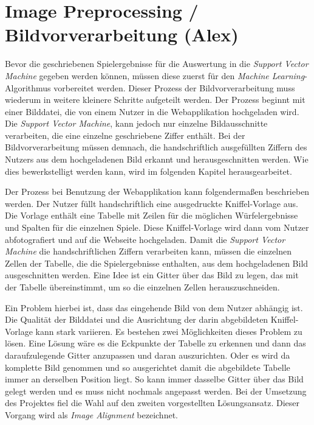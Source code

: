 \section{Image Preprocessing / Bildvorverarbeitung (Alex)}
Bevor die geschriebenen Spielergebnisse für die Auswertung in die \textit{Support Vector Machine} gegeben werden können, müssen diese zuerst
für den \textit{Machine Learning}-Algorithmus vorbereitet werden. Dieser Prozess der Bildvorverarbeitung muss wiederum in weitere kleinere
Schritte aufgeteilt werden. Der Prozess beginnt mit einer Bilddatei, die von einem Nutzer in die Webapplikation hochgeladen wird. 
Die \textit{Support Vector Machine}, kann jedoch nur einzelne Bildausschnitte verarbeiten, die eine einzelne geschriebene Ziffer enthält.
Bei der Bildvorverarbeitung müssen demnach, die handschriftlich ausgefüllten Ziffern des Nutzers aus dem hochgeladenen Bild erkannt und
herausgeschnitten werden. Wie dies bewerkstelligt werden kann, wird im folgenden Kapitel herausgearbeitet.

Der Prozess bei Benutzung der Webapplikation kann folgendermaßen beschrieben werden. Der Nutzer füllt handschriftlich eine ausgedruckte Kniffel-Vorlage aus.
Die Vorlage enthält eine Tabelle mit Zeilen für die möglichen Würfelergebnisse und Spalten für die einzelnen Spiele. Diese Kniffel-Vorlage 
wird dann vom Nutzer abfotografiert und auf die Webseite hochgeladen. Damit die \textit{Support Vector Machine} die handschriftlichen Ziffern verarbeiten kann,
müssen die einzelnen Zellen der Tabelle, die die Spielergebnisse enthalten, aus dem hochgeladenen Bild ausgeschnitten werden. Eine Idee ist
ein Gitter über das Bild zu legen, das mit der Tabelle übereinstimmt, um so die einzelnen Zellen herauszuschneiden.

Ein Problem hierbei ist, dass das eingehende Bild von dem Nutzer abhängig ist. Die Qualität der Bilddatei und die Ausrichtung der darin abgebildeten 
Kniffel-Vorlage kann stark variieren. Es bestehen zwei Möglichkeiten dieses Problem zu lösen. Eine Lösung wäre es die Eckpunkte der Tabelle zu erkennen und 
dann das daraufzulegende Gitter anzupassen und daran auszurichten. Oder es wird da komplette Bild genommen und so ausgerichtet damit die abgebildete Tabelle
immer an derselben Position liegt. So kann immer dasselbe Gitter über das Bild gelegt werden und es muss nicht nochmals angepasst werden.
Bei der Umsetzung des Projektes fiel die Wahl auf den zweiten vorgestellten Lösungsansatz. Dieser Vorgang wird als \textit{Image Alignment} bezeichnet.

